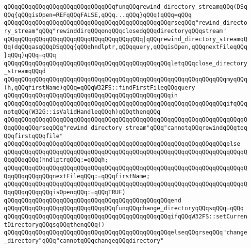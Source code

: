 \newline
\verb|qQQqqQQqqQQqqQQqqQQqqQQqqQQqqQQqfunqQQqrewind_directory_streamqQQq(DSqQQq{qQQqisOpen=REFqQQqFALSE,qQQq...qQQq}qQQq)qQQq=qQQq|\newline
\verb|qQQqqQQqqQQqqQQqqQQqqQQqqQQqqQQqqQQqqQQqqQQqqQQqrseqQQq"rewind_directory_stream"qQQq"rewinddirqQQqonqQQqclosedqQQqdirectoryqQQqstream"|\newline
\verb|qQQqqQQqqQQqqQQqqQQqqQQqqQQqqQQqqQQqqQQq|\verb#|qQQqrewind_directory_streamqQQq(dqQQqasqQQqDSqQQq{qQQqhndlptr,qQQqquery,qQQqisOpen,qQQqnextFileqQQq}qQQq)qQQq=qQQq#\newline
\verb|qQQqqQQqqQQqqQQqqQQqqQQqqQQqqQQqqQQqqQQqqQQqqQQqletqQQqclose_directory_streamqQQqd|\newline
\verb|qQQqqQQqqQQqqQQqqQQqqQQqqQQqqQQqqQQqqQQqqQQqqQQqqQQqqQQqqQQqqQQqmyqQQq(h,qQQqfirstName)qQQq=qQQqW32FS::findFirstFileqQQqquery|\newline
\verb|qQQqqQQqqQQqqQQqqQQqqQQqqQQqqQQqqQQqqQQqqQQqqQQqin|\newline
\verb|qQQqqQQqqQQqqQQqqQQqqQQqqQQqqQQqqQQqqQQqqQQqqQQqqQQqqQQqqQQqqQQqifqQQqnotqQQq(W32G::isValidHandleqQQqh)qQQqthenqQQq|\newline
\verb|qQQqqQQqqQQqqQQqqQQqqQQqqQQqqQQqqQQqqQQqqQQqqQQqqQQqqQQqqQQqqQQqqQQqqQQqqQQqqQQqrseqQQq"rewind_directory_stream"qQQq"cannotqQQqrewindqQQqtoqQQqfirstqQQqfile"|\newline
\verb|qQQqqQQqqQQqqQQqqQQqqQQqqQQqqQQqqQQqqQQqqQQqqQQqqQQqqQQqqQQqqQQqelse|\newline
\verb|qQQqqQQqqQQqqQQqqQQqqQQqqQQqqQQqqQQqqQQqqQQqqQQqqQQqqQQqqQQqqQQqqQQqqQQqqQQqqQQq(hndlptrqQQq:=qQQqh;|\newline
\verb|qQQqqQQqqQQqqQQqqQQqqQQqqQQqqQQqqQQqqQQqqQQqqQQqqQQqqQQqqQQqqQQqqQQqqQQqqQQqqQQqqQQqnextFileqQQq:=qQQqfirstName;|\newline
\verb|qQQqqQQqqQQqqQQqqQQqqQQqqQQqqQQqqQQqqQQqqQQqqQQqqQQqqQQqqQQqqQQqqQQqqQQqqQQqqQQqqQQqisOpenqQQq:=qQQqTRUE)|\newline
\verb|qQQqqQQqqQQqqQQqqQQqqQQqqQQqqQQqqQQqqQQqqQQqqQQqend|\newline
\newline
\verb|qQQqqQQqqQQqqQQqqQQqqQQqqQQqqQQqfunqQQqchange_directoryqQQqsqQQq=qQQq|\newline
\verb|qQQqqQQqqQQqqQQqqQQqqQQqqQQqqQQqqQQqqQQqqQQqqQQqifqQQqW32FS::setCurrentDirectoryqQQqsqQQqthenqQQq()|\newline
\verb|qQQqqQQqqQQqqQQqqQQqqQQqqQQqqQQqqQQqqQQqqQQqqQQqelseqQQqrseqQQq"change_directory"qQQq"cannotqQQqchangeqQQqdirectory"|\newline
